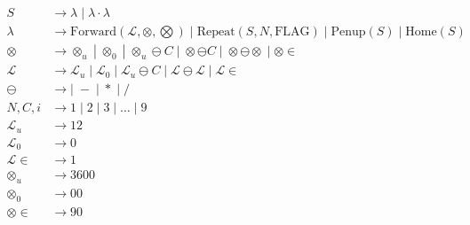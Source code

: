 \begin{align*}
    S &\rightarrow \lambda \;|\; \lambda \cdot \lambda \\
    \lambda &\rightarrow \text{Forward}(\mathcal{L}, \otimes, \bigotimes) \;|\; \text{Repeat}(S, N, \text{FLAG}) \;|\; \text{Penup}(S) \;|\; \text{Home}(S) \\
    \otimes &\rightarrow \otimes_u \;|\; \otimes_0 \;|\; \otimes_u \ominus C \;|\; \otimes \ominus C \;|\; \otimes \ominus \otimes \;|\; \otimes\in \\
    \mathcal{L} &\rightarrow \mathcal{L}_u \;|\; \mathcal{L}_0 \;|\; \mathcal{L}_u \ominus C \;|\; \mathcal{L} \ominus \mathcal{L} \;|\; \mathcal{L}\in \\
    \ominus &\rightarrow | \;- \;|\; * \;|\; / \\
    N, C, i &\rightarrow 1 \;|\; 2 \;|\; 3 \;|\; \ldots \;|\; 9 \\
    \mathcal{L}_u &\rightarrow 12 \\
    \mathcal{L}_0 &\rightarrow 0 \\
    \mathcal{L}\in &\rightarrow 1 \\
    \otimes_u &\rightarrow 3600 \\
    \otimes_0 &\rightarrow 00 \\
    \otimes\in &\rightarrow 90 \\
\end{align*}